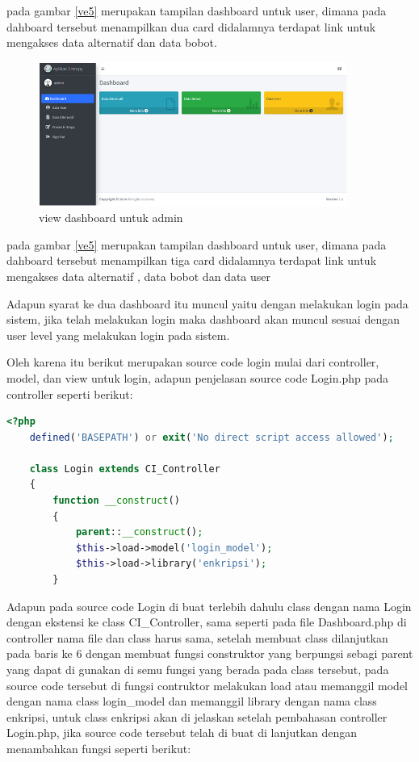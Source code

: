 pada gambar \ref{ve5} merupakan tampilan dashboard untuk user, dimana pada dahboard tersebut menampilkan dua card didalamnya terdapat link untuk mengakses data alternatif dan data bobot.


\begin{figure}[!htbp]
	\centerline{\includegraphics[width=0.90\textwidth]{figures/view/6.png}}
	\caption{view dashboard untuk admin}
	\label{ve6}
\end{figure}

pada gambar \ref{ve5} merupakan tampilan dashboard untuk user, dimana pada dahboard tersebut menampilkan tiga card didalamnya terdapat link untuk mengakses data alternatif , data bobot dan data user

Adapun syarat ke dua dashboard itu muncul yaitu dengan melakukan login pada sistem, jika telah melakukan login maka dashboard akan muncul sesuai dengan user level yang melakukan login pada sistem.\par

Oleh karena itu berikut merupakan source code login mulai dari controller, model, dan view untuk login, adapun penjelasan source code Login.php pada controller seperti berikut:\par
\pagebreak
\begin{lstlisting}[language=PHP]
	<?php  
	defined('BASEPATH') or exit('No direct script access allowed');  
	  
	class Login extends CI_Controller  
	{  
	    function __construct()  
	    {  
	        parent::__construct();  
	        $this->load->model('login_model');  
	        $this->load->library('enkripsi');  
	    } 
\end{lstlisting}

Adapun pada source code Login di buat terlebih dahulu class dengan nama Login dengan ekstensi ke class CI\_Controller, sama seperti pada file Dashboard.php di controller nama file dan class harus sama, setelah membuat class dilanjutkan pada baris ke 6 dengan membuat fungsi construktor yang berpungsi sebagi parent yang dapat di gunakan di semu fungsi yang berada pada class tersebut, pada source code tersebut di fungsi contruktor melakukan load atau memanggil model dengan nama class login\_model dan memanggil library dengan nama class enkripsi, untuk class enkripsi akan di jelaskan setelah pembahasan controller Login.php, jika source code tersebut telah di buat di lanjutkan dengan menambahkan fungsi seperti berikut:\par

